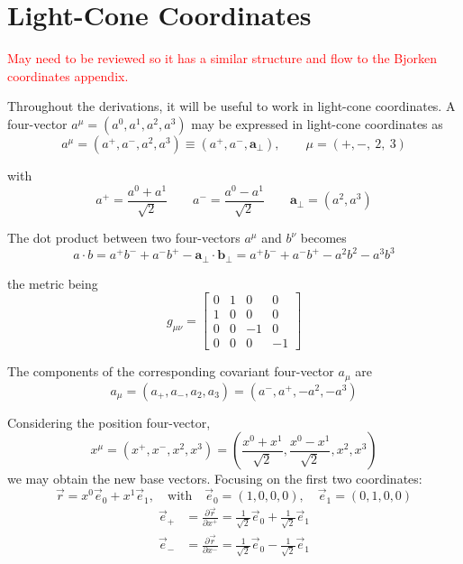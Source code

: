 \section{Light-Cone Coordinates}
\label{ap:Light_Cone}
\textcolor{red}{May need to be reviewed so it has a similar structure and flow to the Bjorken coordinates appendix.}

Throughout the derivations, it will be useful to work in light-cone coordinates. A four-vector $a^\mu = (a^0,a^1,a^2,a^3)$ may be expressed in light-cone coordinates as
\begin{equation}
a^\mu = (a^+, a^-, a^2, a^3) \equiv (a^+, a^-, \mathbf{a}_\perp), \qquad \mu = (+,-,~2,~3)
\end{equation}

\noindent with 
\begin{equation}
	a^+ = \frac{a^0 + a^1}{\sqrt{2}} \qquad a^- = \frac{a^0 - a^1}{\sqrt{2}} \qquad \mathbf{a}_\perp = (a^2,a^3)
\end{equation}

The dot product between two four-vectors $a^\mu$ and $b^\nu$ becomes
\begin{equation}
	a \cdot b =  a^+ b^- + a^- b^+ - \mathbf{a}_\perp \cdot \mathbf{b}_\perp = a^+ b^- + a^- b^+ - a^2 b^2 - a^3 b^3 
\end{equation}

\noindent the metric being
\begin{equation}
	g_ {\mu \nu} = \begin{bmatrix}
		0 & 1 & 0 & 0 \\
		1 & 0 & 0 & 0 \\
		0 & 0 & -1 & 0 \\
		0 & 0 & 0 & -1 
	\end{bmatrix}
	\label{eq:light_cone_metric}
\end{equation}

The components of the corresponding covariant four-vector $a_\mu$ are
\begin{equation}
	a_\mu = (a_+, a_-, a_2, a_3) = (a^-, a^+, -a^2, -a^3)
\end{equation}

Considering the position four-vector,
\begin{equation}
	x^\mu = (x^+, x^-, x^2, x^3) = \left( \frac{x^0+x^1}{\sqrt{2}}, \frac{x^0-x^1}{\sqrt{2}}, x^2, x^3  \right)
\end{equation}
we may obtain the new base vectors. Focusing on the first two coordinates:
\begin{equation}
	\vec{r} = x^0 \vec{e}_0 + x^1 \vec{e}_1, \quad \text{with} \quad \vec{e}_0 = (1,0,0,0), \quad \vec{e}_1=(0,1,0,0)
\end{equation} 
\begin{equation}
\begin{split}
	\vec{e}_+ & = \frac{\partial \vec{r}}{\partial x^+} = \frac{1}{\sqrt{2}} \vec{e}_0 + \frac{1}{\sqrt{2}} \vec{e}_1 \\
	\vec{e}_- & = \frac{\partial \vec{r}}{\partial x^-} = \frac{1}{\sqrt{2}} \vec{e}_0 - \frac{1}{\sqrt{2}} \vec{e}_1
\end{split}
\end{equation}

